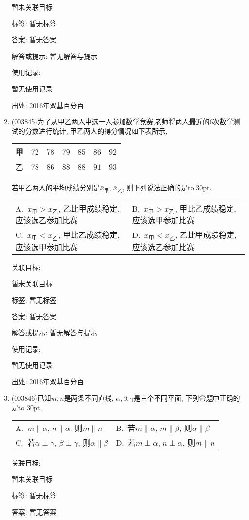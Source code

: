 \documentclass[10pt,a4paper]{article}
\newcommand{\blank}[1]{\underline{\hbox to #1pt{}}}
\newcommand{\twoch}[4]{\par\begin{tabular}{p{.46\textwidth}p{.46\textwidth}}
A.~#1& B.~#2\\
C.~#3& D.~#4
\end{tabular}}
\begin{document}
\begin{enumerate}[1.]
暂未关联目标



标签: 暂无标签

答案: 暂无答案

解答或提示: 暂无解答与提示

使用记录:

暂无使用记录


出处: 2016年双基百分百
\item { (003845)}为了从甲乙两人中选一人参加数学竞赛,老师将两人最近的$6$次数学测试的分数进行统计, 甲乙两人的得分情况如下表所示, 
\begin{center}
\begin{tabular}{|c|c|c|c|c|c|c|}
	\hline
	甲 & $72$ & $78$ & $79$ & $85$ & $86$ & $92$\\ \hline
	乙 & $78$ & $86$ & $88$ & $88$ & $91$ & $93$\\ \hline
\end{tabular}
\end{center}
若甲乙两人的平均成绩分别是$\bar{x}_{\text{甲}}$, $\bar{x}_{\text{乙}}$, 则下列说法正确的是\blank{30}.
\twoch{$\bar{x}_{\text{甲}}>\bar{x}_{\text{乙}}$, 乙比甲成绩稳定, 应该选乙参加比赛}{$\bar{x}_{\text{甲}}>\bar{x}_{\text{乙}}$, 甲比乙成绩稳定, 应该选甲参加比赛}{$\bar{x}_{\text{甲}}<\bar{x}_{\text{乙}}$, 甲比乙成绩稳定, 应该选甲参加比赛}{$\bar{x}_{\text{甲}}<\bar{x}_{\text{乙}}$, 乙比甲成绩稳定, 应该选乙参加比赛}


关联目标:

暂未关联目标



标签: 暂无标签

答案: 暂无答案

解答或提示: 暂无解答与提示

使用记录:

暂无使用记录


出处: 2016年双基百分百
\item { (003846)}已知$m,n$是两条不同直线, $\alpha,\beta,\gamma$是三个不同平面, 下列命题中正确的是\blank{30}.
\twoch{$m\parallel \alpha$, $n\parallel \alpha$, 则$m\parallel n$}{若$m\parallel \alpha$, $m\parallel \beta$, 则$\alpha\parallel \beta$}{若$\alpha\perp \gamma$, $\beta\perp \gamma$, 则$\alpha\parallel \beta$}{若$m\perp \alpha$, $n\perp \alpha$, 则$m\parallel n$}


关联目标:

暂未关联目标



标签: 暂无标签

答案: 暂无答案


\end{enumerate}
\end{document}
